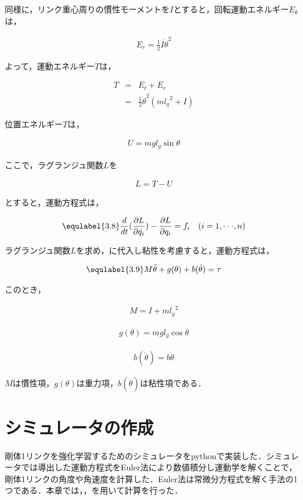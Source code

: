 同様に，リンク重心周りの慣性モーメントを$I$とすると，回転運動エネルギー$E_{k}$は，

\begin{eqnarray}
  E_{r} 
  =\frac{1}{2}I{\dot{\theta}}^2
\end{eqnarray}

よって，運動エネルギー$T$は，

\begin{eqnarray}
  T
  &=&E_{t} + E_{r} \nonumber \\
  &=&\frac{1}{2}{\dot{\theta}}^2(m{l_{g}}^2 + I)
\end{eqnarray}

位置エネルギー$T$は，

\begin{eqnarray}
  U
  = mgl_{g}\sin\theta
\end{eqnarray}

ここで，ラグランジュ関数$L$を

\begin{eqnarray}
  L
  =T - U
\end{eqnarray}

とすると，運動方程式は，

\begin{eqnarray}
  \equlabel{3.8}
  \frac{d}{dt}(\frac{\partial L}{\partial \dot{q_{i}}}) - \frac{\partial L}{\partial q_{i}} = f_{i} \quad (i = 1,\cdot\cdot\cdot, n)
\end{eqnarray}

ラグランジュ関数$L$を求め，に代入し粘性を考慮すると，運動方程式は，

\begin{eqnarray}
  \equlabel{3.9}
  M\ddot{\theta} + g(\theta) + b(\dot{\theta}) = \tau
\end{eqnarray}

このとき，

\begin{eqnarray}
  M = I + m{l_{g}}^2
\end{eqnarray}

\begin{eqnarray}
  g(\theta) = mgl_{g}\cos\theta
\end{eqnarray}

\begin{eqnarray}
  b(\dot{\theta}) = b\dot{\theta}
\end{eqnarray}

$M$は慣性項，$g(\theta)$は重力項，$b(\dot{\theta})$は粘性項である．

\section{シミュレータの作成}
剛体1リンクを強化学習するためのシミュレータをpythonで実装した．シミュレータでは導出した運動方程式をEuler法\cite{euler}により数値積分し運動学を解くことで，剛体1リンクの角度や角速度を計算した．Euler法は常微分方程式を解く手法の1つである．本章では，，を用いて計算を行った．\\

